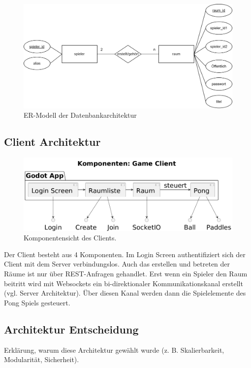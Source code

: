 \documentclass[
]{article}
\begin{document}
\begin{figure}[H]
	\centering
	\includegraphics[width=\textwidth ]{resources/ER-Modell.png}
	\caption{ER-Modell der Datenbankarchitektur}
	\label{fig:ER-Modell}
\end{figure}





\subsection{Client Architektur}
\begin{figure}[H]
	\centering
	\includegraphics[width=\textwidth ]{resources/Client-Architektur.png}
	\caption{Komponentensicht des Clients.}
	\label{fig:clientarchitektur}
\end{figure}
Der Client besteht aus 4 Komponenten. Im Login Screen authentifiziert sich der Client mit dem Server verbindungslos. Auch das erstellen und betreten der Räume ist nur über REST-Anfragen gehandlet. Erst wenn ein Spieler den Raum beitritt wird mit Websockets ein bi-direktionaler Kommunikationskanal erstellt (vgl. Server Architektur). Über diesen Kanal werden dann die Spielelemente des Pong Spiels gesteuert. 


\hypertarget{section-achitactural-decision}{
\subsection{Architektur Entscheidung}}
Erklärung, warum diese Architektur gewählt wurde (z. B. Skalierbarkeit, Modularität, Sicherheit).
\end{document}
